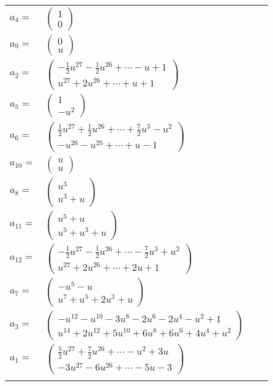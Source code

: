 \documentclass[1p]{elsarticle_modified}
\theoremstyle{definition}
\begin{document}
\begin{tabular}{m{7pt} m{180pt} m{7pt} m{180pt} }
\flushright $a_{4}=$&$\begin{pmatrix}1\\0\end{pmatrix}$ \\
\flushright $a_{9}=$&$\begin{pmatrix}0\\u\end{pmatrix}$ \\
\flushright $a_{2}=$&$\begin{pmatrix}-\frac{1}{2} u^{27}-\frac{1}{2} u^{26}+\cdots- u+1\\u^{27}+2 u^{26}+\cdots+u+1\end{pmatrix}$ \\
\flushright $a_{5}=$&$\begin{pmatrix}1\\- u^2\end{pmatrix}$ \\
\flushright $a_{6}=$&$\begin{pmatrix}\frac{1}{2} u^{27}+\frac{1}{2} u^{26}+\cdots+\frac{7}{2} u^3- u^2\\- u^{26}- u^{25}+\cdots+u-1\end{pmatrix}$ \\
\flushright $a_{10}=$&$\begin{pmatrix}u\\u\end{pmatrix}$ \\
\flushright $a_{8}=$&$\begin{pmatrix}u^3\\u^3+u\end{pmatrix}$ \\
\flushright $a_{11}=$&$\begin{pmatrix}u^5+u\\u^5+u^3+u\end{pmatrix}$ \\
\flushright $a_{12}=$&$\begin{pmatrix}-\frac{1}{2} u^{27}-\frac{1}{2} u^{26}+\cdots-\frac{7}{2} u^3+u^2\\u^{27}+2 u^{26}+\cdots+2 u+1\end{pmatrix}$ \\
\flushright $a_{7}=$&$\begin{pmatrix}- u^5- u\\u^7+u^5+2 u^3+u\end{pmatrix}$ \\
\flushright $a_{3}=$&$\begin{pmatrix}- u^{12}- u^{10}-3 u^8-2 u^6-2 u^4- u^2+1\\u^{14}+2 u^{12}+5 u^{10}+6 u^8+6 u^6+4 u^4+u^2\end{pmatrix}$ \\
\flushright $a_{1}=$&$\begin{pmatrix}\frac{5}{2} u^{27}+\frac{7}{2} u^{26}+\cdots- u^2+3 u\\-3 u^{27}-6 u^{26}+\cdots-5 u-3\end{pmatrix}$\\&\end{tabular}
\end{document}
